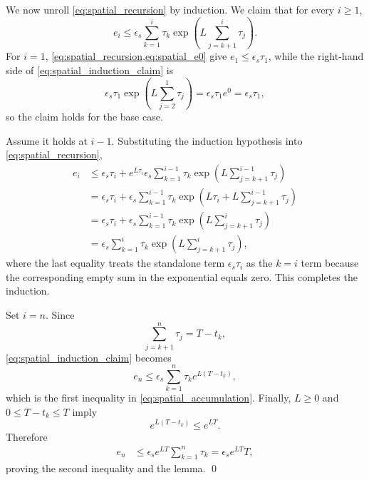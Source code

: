\documentclass{article}
\theoremstyle{plain}
\theoremstyle{definition}
\theoremstyle{remark}
\begin{document}
We now unroll \cref{eq:spatial_recursion} by induction. We claim that for every $i\ge1$,
\begin{equation}
e_i
\le
\epsilon_s
\sum_{k=1}^{i}
\tau_k
\exp\!\left(
L\sum_{j=k+1}^{i}\tau_j
\right).
\label{eq:spatial_induction_claim}
\end{equation}
For $i=1$, \cref{eq:spatial_recursion,eq:spatial_e0} give $e_1\le\epsilon_s\tau_1$, while the right-hand side of \cref{eq:spatial_induction_claim} is
\begin{equation}
\epsilon_s\tau_1\exp\!\left(L\sum_{j=2}^{1}\tau_j\right)
=\epsilon_s\tau_1e^0
=\epsilon_s\tau_1,
\end{equation}
so the claim holds for the base case.

Assume it holds at $i-1$. Substituting the induction hypothesis into \cref{eq:spatial_recursion},
\begin{align}
e_i
&\le \epsilon_s\tau_i
+e^{L\tau_i}
\epsilon_s
\sum_{k=1}^{i-1}
\tau_k
\exp\!\left(
L\sum_{j=k+1}^{i-1}\tau_j
\right)
\nonumber\\
&=\epsilon_s\tau_i
+\epsilon_s
\sum_{k=1}^{i-1}
\tau_k
\exp\!\left(
L\tau_i+L\sum_{j=k+1}^{i-1}\tau_j
\right)
\nonumber\\
&=\epsilon_s\tau_i
+\epsilon_s
\sum_{k=1}^{i-1}
\tau_k
\exp\!\left(
L\sum_{j=k+1}^{i}\tau_j
\right)
\nonumber\\
&=\epsilon_s
\sum_{k=1}^{i}
\tau_k
\exp\!\left(
L\sum_{j=k+1}^{i}\tau_j
\right),
\end{align}
where the last equality treats the standalone term $\epsilon_s\tau_i$ as the $k=i$ term because the corresponding empty sum in the exponential equals zero. This completes the induction.

Set $i=n$. Since
\begin{equation}
\sum_{j=k+1}^{n}\tau_j=T-t_k,
\end{equation}
\cref{eq:spatial_induction_claim} becomes
\begin{equation}
e_n
\le
\epsilon_s\sum_{k=1}^{n}\tau_k e^{L(T-t_k)},
\end{equation}
which is the first inequality in \cref{eq:spatial_accumulation}. Finally, $L\ge0$ and $0\le T-t_k\le T$ imply
\begin{equation}
e^{L(T-t_k)}\le e^{LT}.
\end{equation}
Therefore
\begin{align}
e_n
&\le
\epsilon_s e^{LT}\sum_{k=1}^{n}\tau_k
=\epsilon_s e^{LT}T,
\end{align}
proving the second inequality and the lemma. \qed
\end{document}
